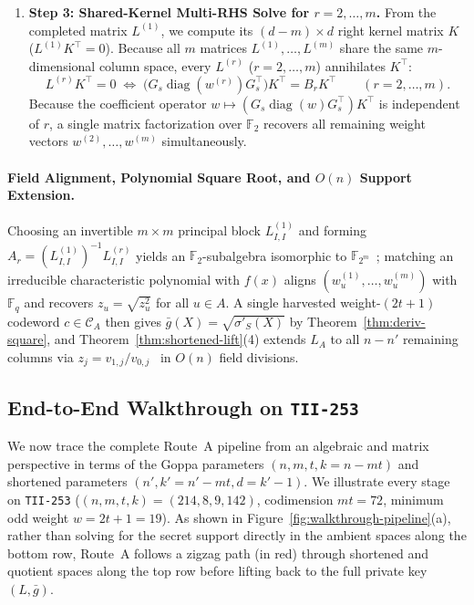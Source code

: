 \documentclass[11pt,a4paper]{article}
\theoremstyle{definition}
\theoremstyle{remark}
\newcommand{\F}{\mathbb{F}}
\newcommand{\diag}{\operatorname{diag}}
\begin{document}
\begin{enumerate}[leftmargin=2em]
    \item \textbf{Step 3: Shared-Kernel Multi-RHS Solve for $r = 2, \dots, m$.}
    From the completed matrix $L^{(1)}$, we compute its $(d - m) \times d$ right kernel matrix $K$ ($L^{(1)} K^\top = 0$). Because all $m$ matrices $L^{(1)}, \dots, L^{(m)}$ share the same $m$-dimensional column space, every $L^{(r)}$ ($r = 2, \dots, m$) annihilates $K^\top$:
    \begin{equation}
    \label{eq:shared-kernel-rhs}
        L^{(r)} K^\top = 0
        \;\iff\;
        \Big(G_s \diag(w^{(r)}) G_s^\top\Big) K^\top = B_r K^\top \qquad (r = 2, \dots, m).
    \end{equation}
    Because the coefficient operator $w \mapsto (G_s \diag(w) G_s^\top) K^\top$ is independent of $r$, a single matrix factorization over $\F_2$ recovers all remaining weight vectors $w^{(2)}, \dots, w^{(m)}$ simultaneously.
\end{enumerate}

\paragraph{Field Alignment, Polynomial Square Root, and $O(n)$ Support Extension.}
Choosing an invertible $m \times m$ principal block $L^{(1)}_{I, I}$ and forming $A_r = (L^{(1)}_{I, I})^{-1} L^{(r)}_{I, I}$ yields an $\F_2$-subalgebra isomorphic to $\F_{2^m}$~\cite{Saa26a,Ved26}; matching an irreducible characteristic polynomial with $f(x)$ aligns $(w^{(1)}_u, \dots, w^{(m)}_u)$ with $\F_q$ and recovers $z_u = \sqrt{z_u^2}$ for all $u \in A$. A single harvested weight-$(2t+1)$ codeword $c \in \mathcal{C}_A$ then gives $\bar{g}(X) = \sqrt{\sigma'_S(X)}$ by Theorem~\ref{thm:deriv-square}, and Theorem~\ref{thm:shortened-lift}(4) extends $L_A$ to all $n - n'$ remaining columns via $z_j = v_{1, j} / v_{0, j}$~\cite{KM23} in $O(n)$ field divisions.

\subsection{End-to-End Walkthrough on \texorpdfstring{\texttt{TII-253}}{TII-253}}
\label{subsec:walkthrough-253}

We now trace the complete Route~A pipeline from an algebraic and matrix perspective in terms of the Goppa parameters $(n, m, t, k = n - mt)$ and shortened parameters $(n', k' = n' - mt, d = k' - 1)$. We illustrate every stage on \texttt{TII-253} ($(n, m, t, k) = (214, 8, 9, 142)$, codimension $mt = 72$, minimum odd weight $w = 2t + 1 = 19$). As shown in Figure~\ref{fig:walkthrough-pipeline}(a), rather than solving for the secret support directly in the ambient spaces along the bottom row, Route~A follows a zigzag path (in red) through shortened and quotient spaces along the top row before lifting back to the full private key $(L, \bar{g})$.
\end{document}
